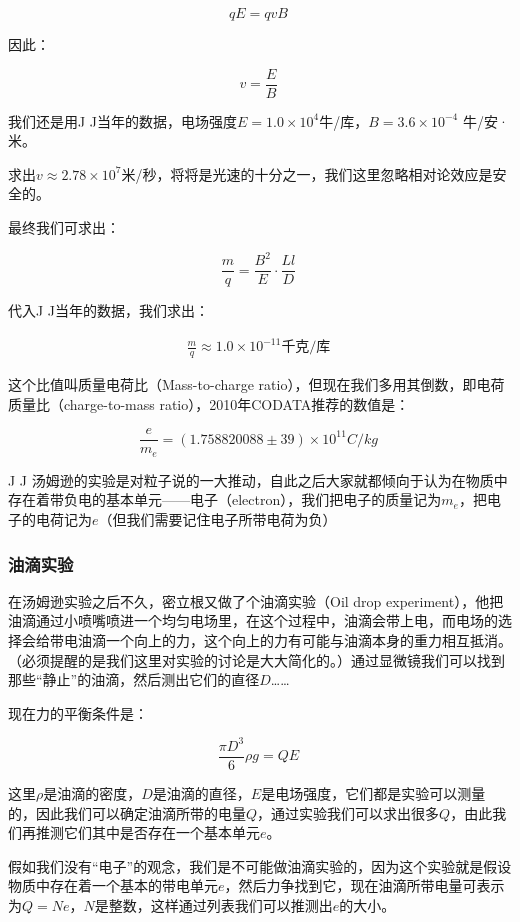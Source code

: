 \begin{equation}
q E = q v B~
\end{equation}

因此：

\begin{equation}
v = \frac{E}{B}~
\end{equation}

我们还是用J J当年的数据，电场强度$E = 1.0 \times 10^4 $牛/库，$B = 3.6 \times 10^{-4}$ 牛/安·米。

求出$v \approx 2.78 \times 10^7 $米/秒，将将是光速的十分之一，我们这里忽略相对论效应是安全的。

最终我们可求出：

\begin{equation}
\frac{m }{q } = \frac{B^2}{ E }  \cdot \frac{L l }{D}~
\end{equation}

代入J J当年的数据，我们求出：

\begin{align}
\text{$\frac{m }{q  } \approx  1.0 \times 10^{-11} $千克/库}~
\end{align}

这个比值叫质量电荷比（Mass-to-charge ratio），但现在我们多用其倒数，即电荷质量比（charge-to-mass ratio），2010年CODATA推荐的数值是：

\begin{equation}
\frac{e}{m_e} = (1.758820088 \pm 39) \times 10^{11} C/kg~
\end{equation}

J J 汤姆逊的实验是对粒子说的一大推动，自此之后大家就都倾向于认为在物质中存在着带负电的基本单元——电子（electron），我们把电子的质量记为$m_e$，把电子的电荷记为$e$（但我们需要记住电子所带电荷为负）

\subsubsection{油滴实验}

在汤姆逊实验之后不久，密立根又做了个油滴实验（Oil drop experiment），他把油滴通过小喷嘴喷进一个均匀电场里，在这个过程中，油滴会带上电，而电场的选择会给带电油滴一个向上的力，这个向上的力有可能与油滴本身的重力相互抵消。（必须提醒的是我们这里对实验的讨论是大大简化的。）通过显微镜我们可以找到那些“静止”的油滴，然后测出它们的直径$D$……

现在力的平衡条件是：

\begin{equation}
\frac{ \pi D^3 }{6} \rho g = Q E~
\end{equation}

这里$\rho$是油滴的密度，$D$是油滴的直径，$E$是电场强度，它们都是实验可以测量的，因此我们可以确定油滴所带的电量$Q$，通过实验我们可以求出很多$Q$，由此我们再推测它们其中是否存在一个基本单元$e$。

假如我们没有“电子”的观念，我们是不可能做油滴实验的，因为这个实验就是假设物质中存在着一个基本的带电单元$e$，然后力争找到它，现在油滴所带电量可表示为$ Q = N e$，$N$是整数，这样通过列表我们可以推测出$e$的大小。


